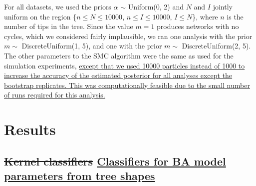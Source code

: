 \documentclass[12pt]{article}\usepackage[]{graphicx}\usepackage[]{color}
\newcommand{\add}[1]{\color{blue} \uline{#1} \color{black}}
\newcommand{\del}[1]{\color{red} \sout{#1} \color{black}}
\begin{document}
For all datasets, we used the priors $\alpha$ $\sim$ Uniform(0, 2) and $N$ and
$I$ jointly uniform on the region \{$n \leq N \leq 10000$, $n \leq I \leq
10000$, $I \leq N$\}, where $n$ is the number of tips in the tree. Since the
value $m = 1$ produces networks with no cycles, which we considered fairly
implausible, we ran one analysis with the prior $m \sim$ DiscreteUniform(1, 5),
and one with the prior $m \sim$ DiscreteUniform(2, 5). The other parameters to
the SMC algorithm were the same as used for the simulation experiments,
\add{except that we used 10000 particles instead of 1000 to increase the
accuracy of the estimated posterior for all analyses except the bootstrap
replicates. This was computationally feasible due to the small number of runs
required for this analysis.}

\section*{Results}

\subsection*{\del{Kernel classifiers}\add{Classifiers for BA model parameters from tree shapes}}
\end{document}
